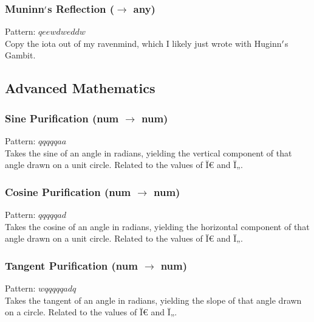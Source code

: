\documentclass[12pt]{article}
\begin{document}
  \label{sec: patterns/readwrite@hexcasting:read/local}
\subsubsection*{Muninn$\rq$s Reflection ($\rightarrow$ any)}

    Pattern: $qeewdweddw$\\
      Copy the iota out of my ravenmind, which I likely just wrote with Huginn$\rq$s Gambit.\\

\newpage

\label{sec:patterns/advanced_math}
\subsection*{Advanced Mathematics}


  \label{sec: patterns/advanced_math@hexcasting:sin}
\subsubsection*{Sine Purification (num $\rightarrow$ num)}

    Pattern: $qqqqqaa$\\
      Takes the sine of an angle in radians, yielding the vertical component of that angle drawn on a unit circle. Related to the values of Ï€ and Ï„.\\


  \label{sec: patterns/advanced_math@hexcasting:cos}
\subsubsection*{Cosine Purification (num $\rightarrow$ num)}

    Pattern: $qqqqqad$\\
      Takes the cosine of an angle in radians, yielding the horizontal component of that angle drawn on a unit circle. Related to the values of Ï€ and Ï„.\\


  \label{sec: patterns/advanced_math@hexcasting:tan}
\subsubsection*{Tangent Purification (num $\rightarrow$ num)}

    Pattern: $wqqqqqadq$\\
      Takes the tangent of an angle in radians, yielding the slope of that angle drawn on a circle. Related to the values of Ï€ and Ï„.\\
\end{document}
